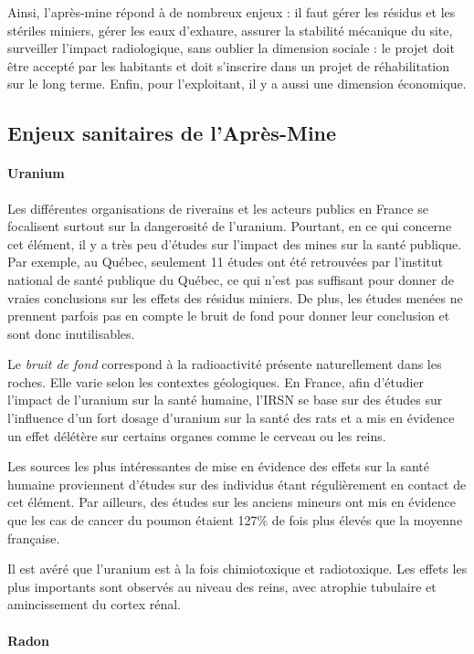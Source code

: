 \documentclass{article}
\begin{document}
Ainsi, l’après-mine répond à de nombreux enjeux : il faut gérer les résidus et les stériles miniers, gérer les eaux d’exhaure, assurer la stabilité mécanique du site, surveiller l’impact radiologique, sans oublier la dimension sociale : le projet doit être accepté par les habitants et doit s’inscrire dans un projet de réhabilitation sur le long terme. Enfin, pour l’exploitant, il y a aussi une dimension économique.

\subsection{Enjeux sanitaires de l’Après-Mine}
\paragraph{Uranium}

Les différentes organisations de riverains et les acteurs publics en France se focalisent surtout sur la dangerosité de l’uranium. Pourtant, en ce qui concerne cet élément, il y a très peu d'études sur l’impact des mines sur la santé publique. Par exemple, au Québec, seulement 11 études ont été retrouvées par l’institut national de santé publique du Québec, ce qui n’est pas suffisant pour donner de vraies conclusions sur les effets des résidus miniers. De plus, les études menées ne prennent parfois pas en compte le bruit de fond pour donner leur conclusion et sont donc inutilisables. 

Le \emph{bruit de fond} correspond à la radioactivité présente naturellement dans les roches. Elle varie selon les contextes géologiques. En France, afin d’étudier l’impact de l’uranium sur la santé humaine, l’IRSN se base sur des études sur l’influence d’un fort dosage d’uranium sur la santé des rats et a mis en évidence un effet délétère sur certains organes comme le cerveau ou les reins. 


Les sources les plus intéressantes de mise en évidence des effets sur la santé humaine proviennent d'études sur des individus étant régulièrement en contact de cet élément. Par ailleurs, des études sur les anciens mineurs ont mis en évidence que les cas de cancer du poumon étaient 127\% de fois plus élevés que la moyenne française. 

Il est avéré que l'uranium est à la fois chimiotoxique et radiotoxique. Les effets les plus importants sont observés au niveau des reins, avec atrophie tubulaire et amincissement du cortex rénal.

\paragraph{Radon}
\end{document}
